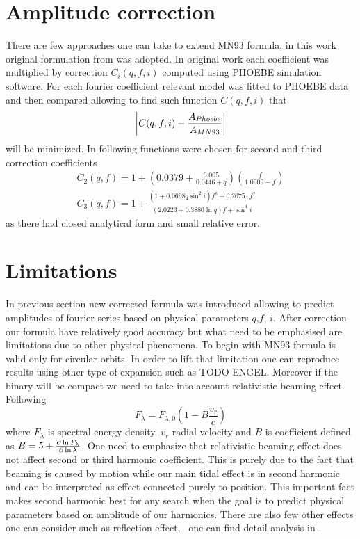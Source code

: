 \documentclass{pracalicmgr}
\begin{document}
\section{Amplitude correction}
There are few approaches one can take to extend MN93 formula, in this work original formulation from \citep{gomel_search_2021} was adopted.
In original work each coefficient was multiplied by correction $C_i(q,f,i)$ computed using PHOEBE simulation software. For each
fourier coefficient relevant model was fitted to PHOEBE data and then compared allowing to find such function $C(q,f,i)$ that 
\begin{equation}
    \abs{C(q,f,i)-\frac{A_{Phoebe}}{A_{MN93}}}
\end{equation}
will be minimized. In \cite{gomel_search_2021} following functions were chosen for second and third correction coefficients
\begin{align}
    C_2(q,f)=1+\left(0.0379+\frac{0.005}{0.0446+q}\right)\left(\frac{f}{1.0909-f}\right)\\
    C_3(q,f)=1+\frac{(1+0.0698q\sin^2{i})f^6+0.2075\cdot f^2}{(2.0223+0.3880\ln{q})f+\sin^4{i}}
\end{align}
as there had closed analytical form and small relative error. 
\section{Limitations}
In previous section new corrected formula was introduced allowing to predict amplitudes of fourier series based on physical parameters $q$,$f$, $i$. After correction 
our formula have relatively good accuracy but what need to be emphasised are limitations due to other physical phenomena. To begin with MN93 formula is valid only for circular orbits. 
In order to lift that limitation one can reproduce results using other type of expansion such as TODO ENGEL. Moreover if the binary will be compact we need to take into account
relativistic beaming effect. Following \citep{loeb_periodic_2003} 
\begin{equation}
    F_{\lambda}=F_{\lambda,0}\left(1-B\frac{v_r}{c}\right)
\end{equation}
where $F_\lambda$ is spectral energy density, $v_r$ radial velocity and $B$ is coefficient defined as $B=5+\pdv{\ln{F_\lambda}}{\ln{\lambda}}$.
One need to emphasize that relativistic beaming effect does not affect second or third harmonic coefficient. This is purely due to the fact that beaming is caused by motion while
our main tidal effect is in second harmonic and can be interpreted as effect connected purely to position. This important fact makes second harmonic best for any search when 
the goal is to predict physical parameters based on amplitude of our harmonics. There are also few other effects one can consider such as reflection effect, \
one can find detail analysis in \citep{gomel_search_2021}.
\end{document}
